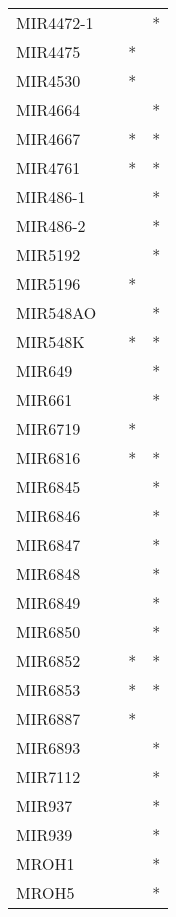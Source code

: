 \begin{longtable}{lccc}
MIR4472-1    &           &     &       * \\
MIR4475      &           &   * &         \\
MIR4530      &           &   * &         \\
MIR4664      &           &     &       * \\
MIR4667      &           &   * &       * \\
MIR4761      &           &   * &       * \\
MIR486-1     &           &     &       * \\
MIR486-2     &           &     &       * \\
MIR5192      &           &     &       * \\
MIR5196      &           &   * &         \\
MIR548AO     &           &     &       * \\
MIR548K      &           &   * &       * \\
MIR649       &           &     &       * \\
MIR661       &           &     &       * \\
MIR6719      &           &   * &         \\
MIR6816      &           &   * &       * \\
MIR6845      &           &     &       * \\
MIR6846      &           &     &       * \\
MIR6847      &           &     &       * \\
MIR6848      &           &     &       * \\
MIR6849      &           &     &       * \\
MIR6850      &           &     &       * \\
MIR6852      &           &   * &       * \\
MIR6853      &           &   * &       * \\
MIR6887      &           &   * &         \\
MIR6893      &           &     &       * \\
MIR7112      &           &     &       * \\
MIR937       &           &     &       * \\
MIR939       &           &     &       * \\
MROH1        &           &     &       * \\
MROH5        &           &     &       * \\

\end{longtable}
